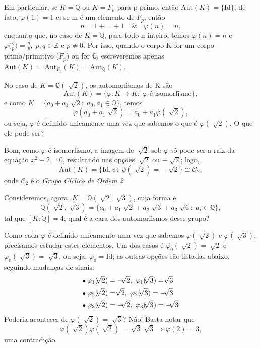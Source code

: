 \documentclass[../algebraIII_notes.tex]{subfiles}
\begin{document}
Em particular, se \(K = \mathbb{Q}\) ou \(K = F_{p}\) para p primo, então \(\mathrm{Aut}(K) = \{\mathrm{Id}\}\); de fato, \(\varphi (1) = 1\) e, se m é um elemento de \(F_{p}\), então
\[
	n = 1 + \dotsc + 1 \quad\&\quad \varphi (n) = n,
\]
enquanto que, no caso de \(K = \mathbb{Q}\), para todo n inteiro, temos \(\varphi (n) = n\) e \(\displaystyle \varphi \biggl(\frac{q}{p}\biggr) = \frac{q}{p},\; p, q\in \mathbb{Z}\) e \(p\neq 0\).
Por isso, quando o corpo K for um corpo primo/primitivo (\(F_{p}\)) ou for \(\mathbb{Q}\), escreveremos apenas \(\mathrm{Aut}(K) \coloneqq \mathrm{Aut}_{F_{p}}(K) = \mathrm{Aut}_{\mathbb{Q}}(K).\)

\begin{example}
	No caso de \(K = \mathbb{Q}(\sqrt[]{2})\), os automorfismos de K são
	\[
		\mathrm{Aut}(K) =  \{\varphi :K\rightarrow K:\; \varphi \text{ é isomorfismo}\},
	\]
	e como \(K = \{a_{0}+a_1\sqrt[]{2}:\; a_{0}, a_1\in \mathbb{Q}\}\), temos
	\[
		\varphi (a_{0} + a_1\sqrt[]{2}) = a_{0} + a_1 \varphi (\sqrt[]{2}),
	\]
	ou seja, \(\varphi \) é definido unicamente uma vez que sabemos o que é \(\varphi (\sqrt[]{2})\). O que ele pode ser?

	Bom, como \(\varphi\) é isomorfismo, a imagem de \(\sqrt[]{2}\) sob \(\varphi \) só pode ser a raiz da equação \(x^{2} - 2 = 0\), resultando nas opções \(\sqrt[]{2}\) ou \(-\sqrt[]{2}\); logo,
	\[
		\mathrm{Aut}(K) = \{\mathrm{Id}, \psi :\; \psi(\sqrt[]{2}) = -\sqrt[]{2}\}\cong \mathcal{C}_{2},
	\]
	onde \(\mathcal{C}_{2}\) é o \hyperlink{cyclic_group}{\textit{Grupo Cíclico de Ordem 2}}
\end{example}
\begin{example}
	Consideremos, agora, \(K = \mathbb{Q}(\sqrt[]{2}, \sqrt[]{3})\), cuja forma é
	\[
		\mathbb{Q}(\sqrt[]{2}, \sqrt[]{3}) = \{a_{0} + a_1 \sqrt[]{2} + a_2 \sqrt[]{3} + a_3 \sqrt[]{6}:\; a_{i}\in \mathbb{Q}\},
	\]
	tal que \([K:\mathbb{Q}]=4\); qual é a cara dos automorfismos desse grupo?

	Como cada \(\varphi \) é definido unicamente uma vez que sabemos \(\varphi (\sqrt[]{2})\) e \(\varphi (\sqrt[]{3})\), precisamos estudar estes elementos.
	Um dos casos é \(\varphi_{0} (\sqrt[]{2}) = \sqrt[]{2}\) e \(\varphi_{0}(\sqrt[]{3}) = \sqrt[]{3}\), ou seja, \(\varphi_{0} = \mathrm{Id}\); as outras opções são listadas abaixo, seguindo mudanças de sinais:
	\begin{align*}
		 & \tikz[baseline=-0.5ex]\draw[black, fill=black, radius=1.5pt](0, 0)circle;\; \varphi_{1}(\sqrt[]{2}) = -\sqrt[]{2},\; \varphi_1(\sqrt[]{3}) = \sqrt[]{3}  \\
		 & \tikz[baseline=-0.5ex]\draw[black, fill=black, radius=1.5pt](0, 0)circle;\; \varphi_{2}(\sqrt[]{2}) = \sqrt[]{2},\; \varphi_2(\sqrt[]{3}) = -\sqrt[]{3}  \\
		 & \tikz[baseline=-0.5ex]\draw[black, fill=black, radius=1.5pt](0, 0)circle;\; \varphi_{3}(\sqrt[]{2}) = -\sqrt[]{2},\; \varphi_3(\sqrt[]{3}) = -\sqrt[]{3}
	\end{align*}
	Poderia acontecer de \(\varphi (\sqrt[]{2}) = \sqrt[]{3}\)? Não! Basta notar que
	\[
		\varphi (\sqrt[]{2})\varphi (\sqrt[]{2}) = \sqrt[]{3}\sqrt[]{3} \Rightarrow \varphi (2) = 3,
	\]
	uma contradição.
\end{example}
\end{document}
